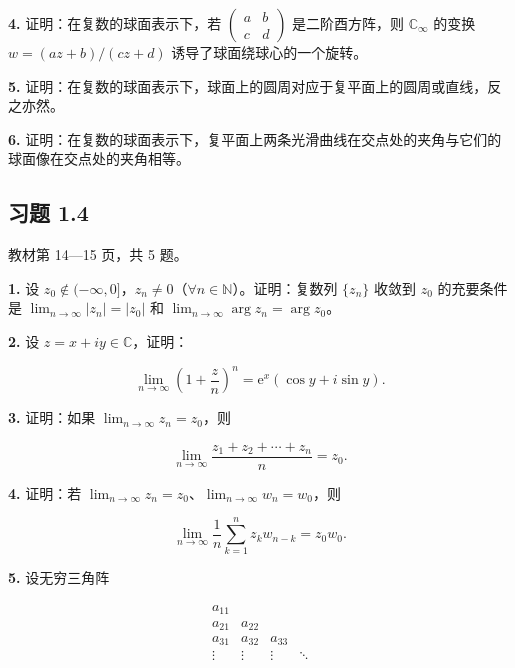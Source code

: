 \documentclass[11pt,a4paper]{article}
\begin{document}
\par{}
\noindent\textbf{4.} 证明：在复数的球面表示下，若
\(\begin{pmatrix}a&b\\c&d\end{pmatrix}\) 是二阶酉方阵，则
\(\mathbb C_\infty\) 的变换 \(w=(az+b)/(cz+d)\)
诱导了球面绕球心的一个旋转。

\par{}
\noindent\textbf{5.}
证明：在复数的球面表示下，球面上的圆周对应于复平面上的圆周或直线，反之亦然。

\par{}
\noindent\textbf{6.}
证明：在复数的球面表示下，复平面上两条光滑曲线在交点处的夹角与它们的球面像在交点处的夹角相等。

\subsection{习题 1.4}\label{ux4e60ux9898-1.4}

教材第 14---15 页，共 5 题。

\par{}
\noindent\textbf{1.} 设
\(z_0\notin(-\infty,0]\)，\(z_n\ne0\)（\(\forall n\in\mathbb N\)）。证明：复数列
\(\{z_n\}\) 收敛到 \(z_0\) 的充要条件是 \(\lim_{n\to\infty}|z_n|=|z_0|\)
和 \(\lim_{n\to\infty}\arg z_n=\arg z_0\)。

\par{}
\noindent\textbf{2.} 设 \(z=x+iy\in\mathbb C\)，证明：

\[
\lim_{n\to\infty}\left(1+\frac zn\right)^n
=\mathrm e^x(\cos y+i\sin y).
\]

\par{}
\noindent\textbf{3.} 证明：如果 \(\lim_{n\to\infty}z_n=z_0\)，则

\[
\lim_{n\to\infty}\frac{z_1+z_2+\cdots+z_n}{n}=z_0.
\]

\par{}
\noindent\textbf{4.} 证明：若
\(\lim_{n\to\infty}z_n=z_0\)、\(\lim_{n\to\infty}w_n=w_0\)，则

\[
\lim_{n\to\infty}\frac1n\sum_{k=1}^n z_kw_{n-k}=z_0w_0.
\]

\par{}
\noindent\textbf{5.} 设无穷三角阵

\[
\begin{matrix}
a_{11}&&&\\
a_{21}&a_{22}&&\\
a_{31}&a_{32}&a_{33}&\\
\vdots&\vdots&\vdots&\ddots
\end{matrix}
\]
\end{document}
